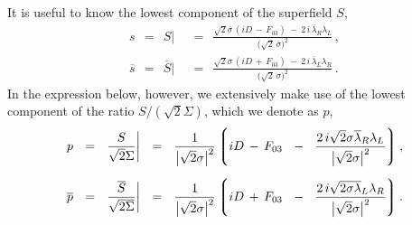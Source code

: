 \documentclass[epsfig,12pt]{article}
\newcommand{\ov}{\overline}
\newcommand{\lgr}{\left\lgroup}
\newcommand{\rgr}{\right\rgroup}
\begin{document}
	It is useful to know the lowest component of the superfield $ S $,
\begin{align*}
%
	s    ~~=~~
	S \Big| &    ~~=~~    \frac{ \sqrt{2}\ov\sigma\, ( iD \,-\, F_{03} ) ~-~ 2\,i\, \ov\lambda{}_R \lambda_L }
						{ \big( \sqrt{2}\, \ov\sigma \big)^2 }\,,
	\\[2mm]
%
	\ov s    ~~=~~
	\ov S \Big| &    ~~=~~    \frac{ \sqrt{2}\sigma\, ( iD \,+\, F_{03} ) ~-~ 2\,i\, \ov\lambda{}_L \lambda_R }
						{ \big( \sqrt{2}\, \sigma \big)^2 }\,.
\end{align*}
	In the expression below, however, we extensively make use of the lowest component of the ratio $ S / (\sqrt{2}\Sigma) $,
	which we denote as $ p $,
\begin{align*}
%
	p    ~~=~~
	\frac{S}{\sqrt{2}\Sigma} \bigg| &    ~~=~~
		\frac{1}{\big|\sqrt{2}\sigma\big|^2}
		\lgr
			iD \,-\, F_{03}
			~~-~~
			\frac{2\, i\sqrt{2}\sigma \ov\lambda{}_R\lambda_L}{\big|\sqrt{2}\sigma\big|^2}
		\rgr,
	\\[2mm]
%
	\ov p    ~~=~~
	\frac{\ov S}{\sqrt{2}\ov\Sigma} \bigg| &    ~~=~~
		\frac{1}{\big|\sqrt{2}\sigma\big|^2}
		\lgr
			iD \,+\, F_{03}
			~~-~~
			\frac{2\, i\sqrt{2}\ov{\sigma\lambda}{}_L\lambda_R}{\big|\sqrt{2}\sigma\big|^2}
		\rgr.
\end{align*}
\end{document}
